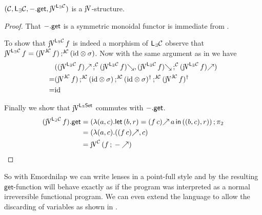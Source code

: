 \documentclass[runningheads,envcountsame]{llncs}
\begin{document}
    \begin{theorem}
        $(\C, \LensEx{\C}, \lget{-}, \juncurry[\LensEx{\C}])$ is a $\juncurry$-structure.
    \end{theorem}
    \begin{proof}
        That ${-}.\mathsf{get}$ is a symmetric monoidal functor is immediate from .
        
        To show that $\juncurry[\LensEx{\C}]\,f$ is indeed a morphism of ${\mathsf{L}_{\exists}\mathcal{C}}$ observe that $\juncurry[\LensEx{\C}]\,f = \comp[\JC]{(\juncurry[\JC]\,f)}{(\tensor{\id}{\swap})}$. Now with the same argument as in  we have 
        \begin{align*}
          & (\comp[\C]{\f{(\juncurry[\LensEx{\C}]\,f)}}{\b{(\juncurry[\LensEx{\C}]\,f)}}, \comp[\C]{\b{(\juncurry[\LensEx{\C}]\,f)}}{\f{(\juncurry[\LensEx{\C}]\,f)}}) \\
        = & \comp[\JC]{\comp[\JC]{(\juncurry[\JC]\,f)}{(\tensor{\id}{\swap})}}{\comp[\JC]{\rev{(\tensor{\id}{\swap})}}{\rev{(\juncurry[\JC]\,f)}}} \\
        = & \id
        \end{align*}
        
        Finally we show that $\juncurry[\LensEx{\Set}]$ commutes with ${-}.\mathsf{get}$.
        \begin{align*}
            \lget{(\juncurry[\LensEx{\C}]\,f)} &= \comp{(\lambda (a, c). \nlet{(b, r)}{\f{(f\,c)}\,a}{((b, c), r)})}{\pi_2} \\
            & = (\lambda (a, c). (\f{(f\,c)}, c) \\
            & = \juncurry[\C]\,(\comp{f}{\f{-}}) 
        \end{align*}
    \end{proof}
    
    So with Emordnilap we can write lenses in a point-full style and by  the resulting $\mathsf{get}$-function will behave exactly as if the program was interpreted as a normal irreversible functional program. We can even extend the language to allow the discarding of variables as shown in .
    
\end{document}
